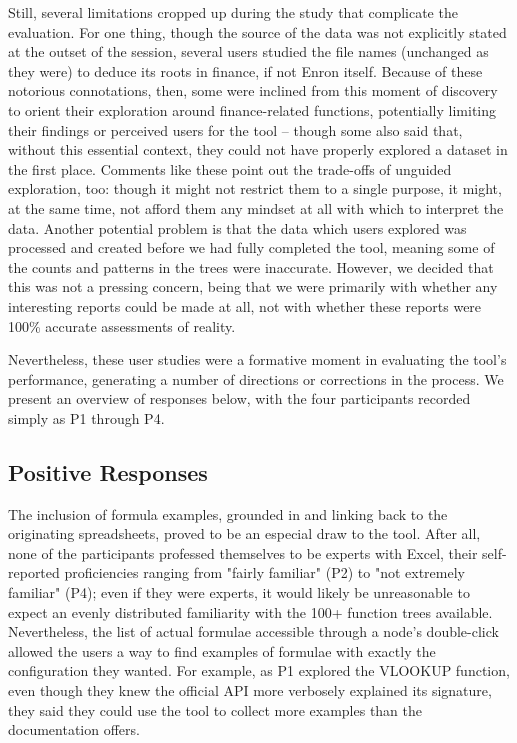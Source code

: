 \documentclass[conference]{IEEEtran}
\begin{document}
	Still, several limitations cropped up during the study that complicate the
	evaluation. For one thing, though the source of the data was not explicitly
	stated at the outset of the session, several users studied the file names
	(unchanged as they were) to deduce its roots in finance, if not Enron itself.
	Because of these notorious connotations, then, some were inclined from this
	moment of discovery to orient their exploration around finance-related
	functions, potentially limiting their findings or perceived users for the tool
	-- though some also said that, without this essential context, they could not
	have properly explored a dataset in the first place. Comments like these point
	out the trade-offs of unguided exploration, too: though it might not restrict
	them to a single purpose, it might, at the same time, not afford them any
	mindset at all with which to interpret the data. Another potential problem is
	that the data which users explored was processed and created before we had
	fully completed the tool, meaning some of the counts and patterns in the trees
	were inaccurate. However, we decided that this was not a pressing concern,
	being that we were primarily with whether any interesting reports could be made
	at all, not with whether these reports were 100\% accurate assessments of
	reality. \par
	
	Nevertheless, these user studies were a formative moment in evaluating the
	tool's performance, generating a number of directions or corrections in the
	process. We present an overview of responses below, with the four participants
	recorded simply as P1 through P4. \par
	
	\subsection{Positive Responses} The inclusion of formula examples, grounded in
	and linking back to the originating spreadsheets, proved to be an especial draw
	to the tool. After all, none of the participants professed themselves to be
	experts with Excel, their self-reported proficiencies ranging from "fairly
	familiar" (P2) to "not extremely familiar" (P4); even if they were experts, it
	would likely be unreasonable to expect an evenly distributed familiarity with
	the 100+ function trees available. Nevertheless, the list of actual formulae
	accessible through a node's double-click allowed the users a way to find
	examples of formulae with exactly the configuration they wanted. For example,
	as P1 explored the VLOOKUP function, even though they knew the official API
	more verbosely explained its signature, they said they could use the tool to
	collect more examples than the documentation offers. \par
	
\end{document}
